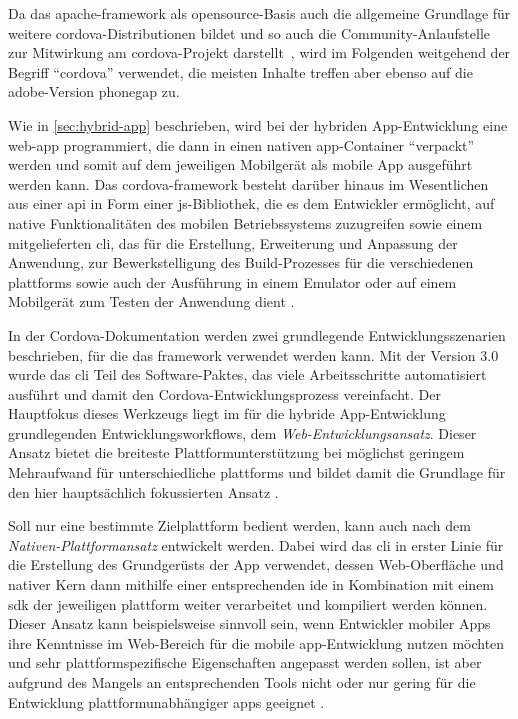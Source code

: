 Da das \gls{apache}-\gls{framework} als \gls{opensource}-Basis auch die allgemeine Grundlage für weitere \gls{cordova}-Distributionen bildet und so auch die Community-Anlaufstelle zur Mitwirkung am \gls{cordova}-Projekt darstellt~\cite{PhoneGap_Cordova_and_whats_in_a_name}, wird im Folgenden weitgehend der Begriff \enquote{\gls{cordova}} verwendet, die meisten Inhalte treffen aber ebenso auf die \gls{adobe}-Version \gls{phonegap} zu.


Wie in \autoref{sec:hybrid-app} beschrieben, wird bei der hybriden App-Entwicklung eine \gls{web-app} programmiert, die dann in einen nativen \gls{app}-Container \enquote{verpackt} werden und somit auf dem jeweiligen Mobilgerät als mobile App ausgeführt werden kann. 
Das \gls{cordova}-\gls{framework} besteht darüber hinaus im Wesentlichen aus einer \gls{api} in Form einer \gls{js}-Bibliothek, die es dem Entwickler ermöglicht, auf native Funktionalitäten des mobilen Betriebssystems zuzugreifen sowie einem mitgelieferten \gls{cli}, das für die Erstellung, Erweiterung und Anpassung der Anwendung, zur Bewerkstelligung des Build-Prozesses für die verschiedenen \glspl{plattform} sowie auch der Ausführung in einem Emulator oder auf einem Mobilgerät zum Testen der Anwendung dient \cite{Cordova-Docs_Overview}.


In der Cordova-Dokumentation werden zwei grundlegende Entwicklungsszenarien beschrieben, für die das \gls{framework} verwendet werden kann. 
Mit der Version 3.0 wurde das \gls{cli} Teil des Software-Paktes, das viele Arbeitsschritte automatisiert ausführt und damit den Cordova-Entwicklungsprozess vereinfacht. 
Der Hauptfokus dieses Werkzeugs liegt im für die hybride App-Entwicklung grundlegenden Entwicklungsworkflows, dem \emph{Web-Ent\-wick\-lungs\-an\-satz}.
Dieser Ansatz bietet die breiteste Plattformunterstützung bei möglichst geringem Mehraufwand für unterschiedliche \glspl{plattform} und bildet damit die Grundlage für den hier hauptsächlich fokussierten Ansatz \cite{Cordova-Docs_CLI}.

Soll nur eine bestimmte Zielplattform bedient werden, kann auch nach dem \emph{Nativen-Plattformansatz} entwickelt werden.
Dabei wird das \gls{cli} in erster Linie für die Erstellung des Grundgerüsts der App verwendet, dessen Web-Oberfläche und nativer Kern dann mithilfe einer entsprechenden \gls{ide} in Kombination mit einem \gls{sdk} der jeweiligen \gls{plattform} weiter verarbeitet und kompiliert werden können. 
Dieser Ansatz kann beispielsweise sinnvoll sein, wenn Entwickler mobiler Apps ihre Kenntnisse im Web-Bereich für die mobile \gls{app}-Entwicklung nutzen möchten und sehr plattformspezifische Eigenschaften angepasst werden sollen, ist aber aufgrund des Mangels an entsprechenden Tools nicht oder nur gering für die Entwicklung plattformunabhängiger \glspl{app} geeignet \cite{Cordova-Docs_CLI}. 

